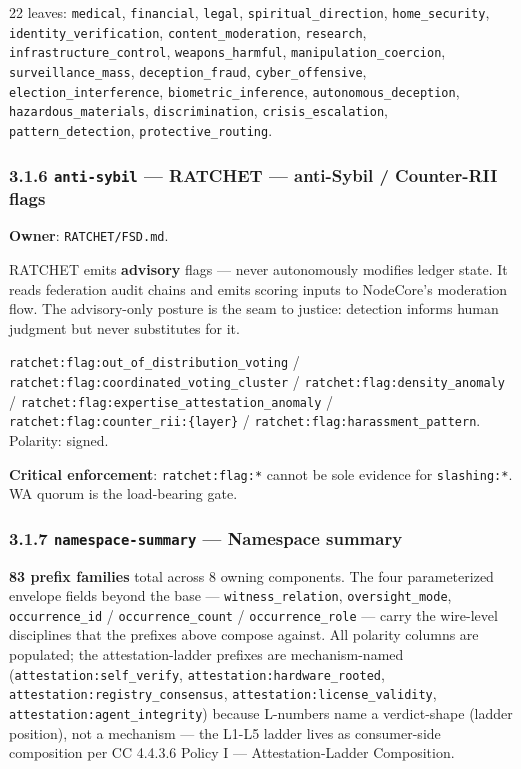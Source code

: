 \documentclass[11pt]{article}
\begin{document}
22 leaves: \texttt{medical}, \texttt{financial}, \texttt{legal}, \texttt{spiritual\_direction}, \texttt{home\_security}, \texttt{identity\_verification}, \texttt{content\_moderation}, \texttt{research}, \texttt{infrastructure\_control}, \texttt{weapons\_harmful}, \texttt{manipulation\_coercion}, \texttt{surveillance\_mass}, \texttt{deception\_fraud}, \texttt{cyber\_offensive}, \texttt{election\_interference}, \texttt{biometric\_inference}, \texttt{autonomous\_deception}, \texttt{hazardous\_materials}, \texttt{discrimination}, \texttt{crisis\_escalation}, \texttt{pattern\_detection}, \texttt{protective\_routing}.


\subsubsection*{3.1.6 \texttt{anti-sybil} — RATCHET — anti-Sybil / Counter-RII flags}


\textbf{Owner}: \texttt{RATCHET/FSD.md}.


RATCHET emits \textbf{advisory} flags — never autonomously modifies ledger state. It reads federation audit chains and emits scoring inputs to NodeCore's moderation flow. The advisory-only posture is the seam to justice: detection informs human judgment but never substitutes for it.


\texttt{ratchet:flag:out\_of\_distribution\_voting} / \texttt{ratchet:flag:coordinated\_voting\_cluster} / \texttt{ratchet:flag:density\_anomaly} / \texttt{ratchet:flag:expertise\_attestation\_anomaly} / \texttt{ratchet:flag:counter\_rii:\{layer\}} / \texttt{ratchet:flag:harassment\_pattern}. Polarity: signed.


\textbf{Critical enforcement}: \texttt{ratchet:flag:*} cannot be sole evidence for \texttt{slashing:*}. WA quorum is the load-bearing gate.


\subsubsection*{3.1.7 \texttt{namespace-summary} — Namespace summary}


\textbf{83 prefix families} total across 8 owning components. The four parameterized envelope fields beyond the base — \texttt{witness\_relation}, \texttt{oversight\_mode}, \texttt{occurrence\_id} / \texttt{occurrence\_count} / \texttt{occurrence\_role} — carry the wire-level disciplines that the prefixes above compose against. All polarity columns are populated; the attestation-ladder prefixes are mechanism-named (\texttt{attestation:self\_verify}, \texttt{attestation:hardware\_rooted}, \texttt{attestation:registry\_consensus}, \texttt{attestation:license\_validity}, \texttt{attestation:agent\_integrity}) because L-numbers name a verdict-shape (ladder position), not a mechanism — the L1-L5 ladder lives as consumer-side composition per CC 4.4.3.6 Policy I — Attestation-Ladder Composition.
\end{document}
